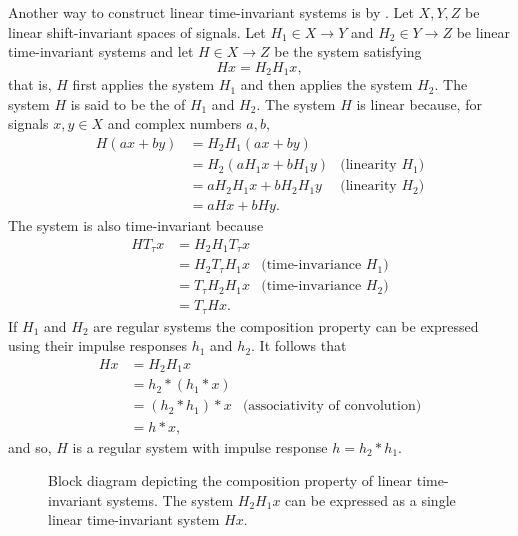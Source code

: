 Another way to construct linear time-invariant systems is by .  Let $X, Y, Z$ be linear shift-invariant spaces of signals.  Let $H_1 \in X \to Y$ and $H_2 \in Y \to Z$ be linear time-invariant systems and let $H \in X \to Z$ be the system satisfying
\[
H x = H_2 H_1 x,
\]
that is, $H$ first applies the system $H_1$ and then applies the system $H_2$.  The system $H$ is said to be the  of $H_1$ and $H_2$.  The system $H$ is linear because, for signals $x,y \in X$ and complex numbers $a,b$,
\begin{align*}
H(ax + by) &= H_2 H_1(ax + by) \\
&= H_2(aH_1 x + bH_1 y )  &\text{(linearity $H_1$)}\\
&= aH_2 H_1 x + bH_2 H_1 y  &\text{(linearity $H_2$)} \\
&= aHx + bHy.
\end{align*}
The system is also time-invariant because
\begin{align*}
H T_\tau x &= H_2H_1 T_\tau x \\
&= H_2 T_\tau H_1 x  &\text{(time-invariance $H_1$)}\\
&= T_\tau H_2 H_1 x  &\text{(time-invariance $H_2$)} \\
&= T_\tau H x .
\end{align*}
If $H_1$ and $H_2$ are regular systems the composition property can be expressed using their impulse responses $h_1$ and $h_2$.  It follows that
\begin{align*}
Hx &= H_2H_1 x \\
&= h_2 * (h_1 * x) \\
&= (h_2* h_1) * x &\text{(associativity of convolution)} \\
&= h * x,
\end{align*}
and so, $H$ is a regular system with impulse response $h = h_2 * h_1$.  %

\begin{figure}
\centering
{}
\caption{Block diagram depicting the composition property of linear time-invariant systems. The system $H_2H_1x$ can be expressed as a single linear time-invariant system $Hx$.}\label{blockdiag:compositionlti}
\end{figure}

